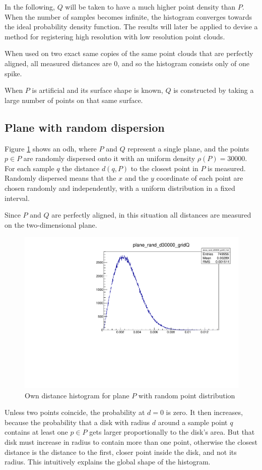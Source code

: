 In the following, $Q$ will be taken to have a much higher point density than $P$. When the number of samples becomes infinite, the histogram converges towards the ideal probability density function. The results will later be applied to devise a method for registering high resolution with low resolution point clouds.

When used on two exact same copies of the same point clouds that are perfectly aligned, all measured distances are $0$, and so the histogram consists only of one spike.

When $P$ is artificial and its surface shape is known, $Q$ is constructed by taking a large number of points on that same surface.

\subsection{Plane with random dispersion}
Figure \ref{fig:plane_rand_d30000} shows an \gls{odh}, where $P$ and $Q$ represent a single plane, and the points $p \in P$ are randomly dispersed onto it with an uniform density $\rho(P) = 30000$. For each sample $q$ the distance $d(q, P)$ to the closest point in $P$ is measured. Randomly dispersed means that the $x$ and the $y$ coordinate of each point are chosen randomly and independently, with a uniform distribution in a fixed interval.

Since $P$ and $Q$ are perfectly aligned, in this situation all distances are measured on the two-dimensional plane.

\begin{figure}[H]
\centering
\includegraphics[width=.6\textwidth]{fig/plane_rand_d30000_gridQ.pdf}
\caption{Own distance histogram for plane $P$ with random point distribution}
\label{fig:plane_rand_d30000}
\end{figure}

Unless two points coincide, the probability at $d = 0$ is zero. It then increases, because the probability that a disk with radius $d$ around a sample point $q$ contains at least one $p \in P$ gets larger proportionally to the disk's area. But that disk must increase in radius to contain more than one point, otherwise the closest distance is the distance to the first, closer point inside the disk, and not its radius. This intuitively explains the global shape of the histogram.

